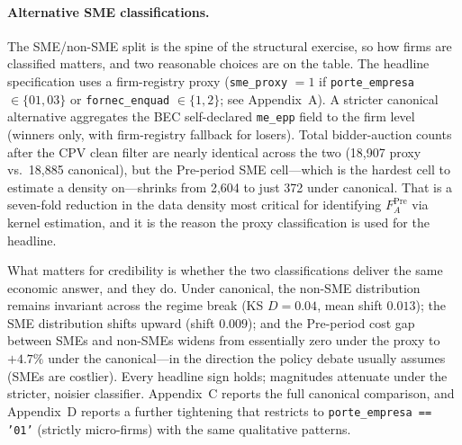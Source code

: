 \documentclass[12pt]{article}
\begin{document}
\paragraph{Alternative SME classifications.}
The SME/non-SME split is the spine of the structural exercise,
so how firms are classified matters, and two reasonable choices
are on the table. The headline specification uses a
firm-registry proxy (\texttt{sme\_proxy} $= 1$ if
\texttt{porte\_empresa} $\in \{01, 03\}$ or \texttt{fornec\_enquad}
$\in \{1, 2\}$; see Appendix~A). A stricter canonical alternative
aggregates the BEC self-declared \texttt{me\_epp} field to the
firm level (winners only, with firm-registry fallback for
losers). Total bidder-auction counts after the CPV clean filter
are nearly identical across the two (18{,}907 proxy vs.\ 18{,}885
canonical), but the Pre-period SME cell---which is the hardest
cell to estimate a density on---shrinks from 2{,}604 to just
372 under canonical. That is a seven-fold reduction in the
data density most critical for identifying $F_A^{\text{Pre}}$
via kernel estimation, and it is the reason the proxy
classification is used for the headline.

What matters for credibility is whether the two classifications
deliver the same economic answer, and they do. Under canonical,
the non-SME distribution remains invariant across the regime
break (KS $D = 0.04$, mean shift $0.013$); the SME distribution
shifts upward (shift $0.009$); and the Pre-period cost gap
between SMEs and non-SMEs widens from essentially zero under
the proxy to $+4.7\%$ under the canonical---in the direction
the policy debate usually assumes (SMEs are costlier). Every
headline sign holds; magnitudes attenuate under the stricter,
noisier classifier. Appendix~C reports the full canonical
comparison, and Appendix~D reports a further tightening that
restricts to \texttt{porte\_empresa == '01'} (strictly micro-firms)
with the same qualitative patterns.
\end{document}
